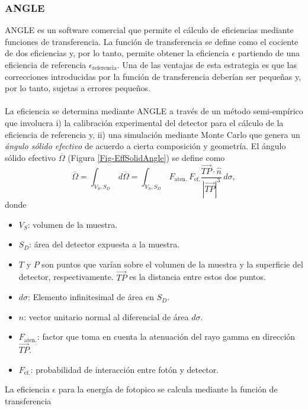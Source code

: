 		\subsubsection{ANGLE}\label{SubSec-ANGLE}
ANGLE es un software comercial que permite el cálculo de eficiencias mediante funciones de transferencia. La función de transferencia se define como el cociente de dos eficiencias y, por lo tanto, permite obtener la eficiencia $\epsilon$ partiendo de una eficiencia de referencia $\epsilon_\text{referencia}$. Una de las ventajas de esta estrategia es que las correcciones introducidas por la función de transferencia deberían ser pequeñas y, por lo tanto, sujetas a errores pequeños. 
\\
\\
La eficiencia se determina mediante ANGLE a través de un método semi-empírico que involucra i) la calibración experimental del detector para el cálculo de la eficiencia de referencia y, ii) una simulación mediante Monte Carlo que genera un \textit{ángulo sólido efectivo} de acuerdo a cierta composición y geometría. El ángulo sólido efectivo $\overline{\Omega}$ (Figura \ref{Fig-EffSolidAngle}) se define como \cite{JOVANOVIC2010385}
\begin{equation}\label{Eq-EffSolidAngle}
\overline{\Omega} = \int_{V_S, S_D}\, d\overline{\Omega} = \int_{V_S, S_D}\,\displaystyle F_{\text{aten.}}\,F_{\text{ef.}} \dfrac{\overrightarrow{TP}\cdot\hat{n}}{|\overrightarrow{TP}|^3}\,d\sigma,
\end{equation}
donde
\begin{itemize}
\item $V_S$: volumen de la muestra.
\item $S_D$: área del detector expuesta a la muestra.
\item $T$ y $P$ son puntos que varían sobre el volumen de la muestra y la superficie del detector, respectivamente. $\overrightarrow{TP}$ es la distancia entre estos dos puntos.
\item $d\sigma$: Elemento infinitesimal de área en $S_D$.
\item $\hat{n}$: vector unitario normal al diferencial de área $d\sigma$.
\item $F_{\text{aten.}}$: factor que toma en cuenta la atenuación del rayo gamma en dirección $\overrightarrow{TP}$.
\item $F_{\text{ef.}}$: probabilidad de interacción entre fotón y detector. 
\end{itemize}
La eficiencia $\epsilon$ para la energía de fotopico se calcula mediante la función de transferencia
